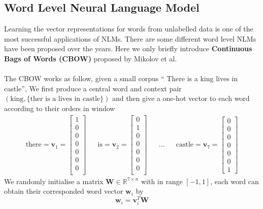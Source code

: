 	\subsection{Word Level Neural Language Model}
	Learning the vector representations for words from unlabelled data is one of the most successful applications of NLMs.
	There are some different word level NLMs have been proposed over the years\cite{mikolov2013distributed,pennington2014glove,morin2005hierarchical}. 
	Here we only briefly introduce \textbf{Continuous Bags of Words (CBOW)} proposed by Mikolov et al\cite{mikolov2013efficient}.\\\\
	The CBOW works as follow, given a small corpus `` There is a king lives in castle'',
	We first produce a central word and context pair $(\text{king},\{\text{ther is a lives in castle}\})$ and then give a one-hot vector to each word according to their orders in window
	\begin{align}
	\text{there} = \mathbf{v}_{1} = \begin{bmatrix}
	1\\0\\0\\0\\0\\0\\0\\
	\end{bmatrix} & &
	\text{is}= \mathbf{v}_{2} = \begin{bmatrix}
	0\\1\\0\\0\\0\\0\\0\\
	\end{bmatrix} & &
	\dots & &
	\text{castle} = \mathbf{v}_{7} = \begin{bmatrix}
	0\\0\\0\\0\\0\\0\\1
	\end{bmatrix}
	\end{align}
	We randomly initialise a matrix $\mathbf{W} \in \mathbb{R}^{7\times n}$ with in range $[-1,1]$, each word can obtain their corresponded word vector $\mathbf{w}_{i}$ by
	\begin{equation}
	\mathbf{w}_{i} = \mathbf{v}_{i}^{T}\mathbf{W}
	\end{equation} 
